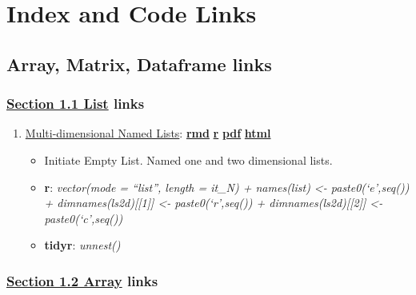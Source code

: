 \documentclass[
]{book}
\providecommand{\tightlist}{%
  \setlength{\itemsep}{0pt}\setlength{\parskip}{0pt}}
\begin{document}
\hypertarget{index-and-code-links}{%
\chapter{Index and Code Links}\label{index-and-code-links}}

\hypertarget{array-matrix-dataframe-links}{%
\section{Array, Matrix, Dataframe links}\label{array-matrix-dataframe-links}}

\hypertarget{section-1.1-listlist-links}{%
\subsection{\texorpdfstring{\protect\hyperlink{list}{Section 1.1 List} links}{Section 1.1 List links}}\label{section-1.1-listlist-links}}

\begin{enumerate}
\def\labelenumi{\arabic{enumi}.}
\tightlist
\item
  \href{https://fanwangecon.github.io/R4Econ/amto/list/htmlpdfr/fs_lst_basics.html}{Multi-dimensional Named Lists}: \href{https://github.com/FanWangEcon/R4Econ/blob/master/amto/list//fs_lst_basics.Rmd}{\textbf{rmd}} \textbar{} \href{https://github.com/FanWangEcon/R4Econ/blob/master/amto/list/htmlpdfr/fs_lst_basics.R}{\textbf{r}} \textbar{} \href{https://github.com/FanWangEcon/R4Econ/blob/master/amto/list/htmlpdfr/fs_lst_basics.pdf}{\textbf{pdf}} \textbar{} \href{https://fanwangecon.github.io/R4Econ/amto/list/htmlpdfr/fs_lst_basics.html}{\textbf{html}}

  \begin{itemize}
  \tightlist
  \item
    Initiate Empty List. Named one and two dimensional lists.
  \item
    \textbf{r}: \emph{vector(mode = ``list'', length = it\_N) + names(list) \textless- paste0(`e',seq()) + dimnames(ls2d){[}{[}1{]}{]} \textless- paste0(`r',seq()) + dimnames(ls2d){[}{[}2{]}{]} \textless- paste0(`c',seq())}
  \item
    \textbf{tidyr}: \emph{unnest()}
  \end{itemize}
\end{enumerate}

\hypertarget{section-1.2-arrayarray-links}{%
\subsection{\texorpdfstring{\protect\hyperlink{array}{Section 1.2 Array} links}{Section 1.2 Array links}}\label{section-1.2-arrayarray-links}}
\end{document}
